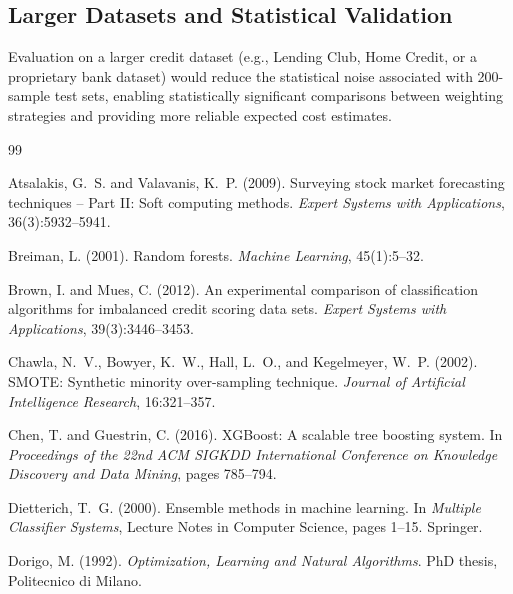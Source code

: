 \documentclass[12pt,a4paper]{article}
\begin{document}
\subsection{Larger Datasets and Statistical Validation}

Evaluation on a larger credit dataset (e.g., Lending Club, Home Credit, or a proprietary bank dataset) would reduce the statistical noise associated with 200-sample test sets, enabling statistically significant comparisons between weighting strategies and providing more reliable expected cost estimates.

\newpage

\begin{thebibliography}{99}

Atsalakis, G.~S. and Valavanis, K.~P. (2009).
\newblock Surveying stock market forecasting techniques -- Part II: Soft computing methods.
\newblock \textit{Expert Systems with Applications}, 36(3):5932--5941.

Breiman, L. (2001).
\newblock Random forests.
\newblock \textit{Machine Learning}, 45(1):5--32.

Brown, I. and Mues, C. (2012).
\newblock An experimental comparison of classification algorithms for imbalanced credit scoring data sets.
\newblock \textit{Expert Systems with Applications}, 39(3):3446--3453.

Chawla, N.~V., Bowyer, K.~W., Hall, L.~O., and Kegelmeyer, W.~P. (2002).
\newblock SMOTE: Synthetic minority over-sampling technique.
\newblock \textit{Journal of Artificial Intelligence Research}, 16:321--357.

Chen, T. and Guestrin, C. (2016).
\newblock XGBoost: A scalable tree boosting system.
\newblock In \textit{Proceedings of the 22nd ACM SIGKDD International Conference on Knowledge Discovery and Data Mining}, pages 785--794.

Dietterich, T.~G. (2000).
\newblock Ensemble methods in machine learning.
\newblock In \textit{Multiple Classifier Systems}, Lecture Notes in Computer Science, pages 1--15. Springer.

Dorigo, M. (1992).
\newblock \textit{Optimization, Learning and Natural Algorithms}.
\newblock PhD thesis, Politecnico di Milano.


\end{thebibliography}
\end{document}
